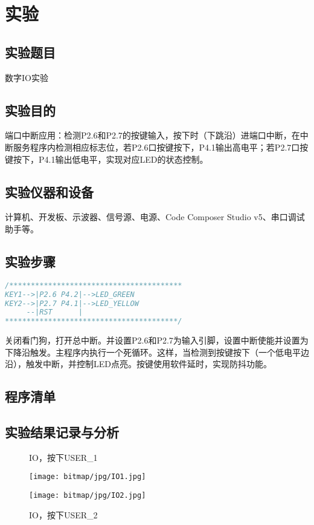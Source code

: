 ﻿%
\section{实验}
\subsection{实验题目}
数字IO实验
\subsection{实验目的}
端口中断应用：检测P2.6和P2.7的按键输入，按下时（下跳沿）进端口中断，在中断服务程序内检测相应标志位，若P2.6口按键按下，P4.1输出高电平；若P2.7口按键按下，P4.1输出低电平，实现对应LED的状态控制。
\subsection{实验仪器和设备}
计算机、开发板、示波器、信号源、电源、Code Composer Studio v5、串口调试助手等。
\subsection{实验步骤}
\begin{lstlisting}[language=C]
/****************************************
KEY1-->|P2.6 P4.2|-->LED_GREEN
KEY2-->|P2.7 P4.1|-->LED_YELLOW
     --|RST      |
****************************************/
\end{lstlisting}
\par\indent 关闭看门狗，打开总中断。并设置P2.6和P2.7为输入引脚，设置中断使能并设置为下降沿触发。主程序内执行一个死循环。这样，当检测到按键按下（一个低电平边沿），触发中断，并控制LED点亮。按键使用软件延时，实现防抖功能。
\subsection{程序清单}

\subsection{实验结果记录与分析}
\begin{figure}[htbp]
	\centering
	\begin{minipage}[htbp]{7.5cm}
		\centering
		\caption{IO，按下USER\_1}
		\label{IO1}
		\texttt{[image: bitmap/jpg/IO1.jpg]}
	\end{minipage}
	\begin{minipage}[htbp]{7.5cm}
		\centering
		\caption{IO，按下USER\_2}
		\label{IO2}
		\texttt{[image: bitmap/jpg/IO2.jpg]}
	\end{minipage}
\end{figure}
